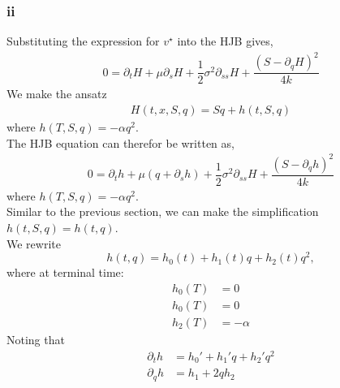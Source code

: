 \documentclass{article}
\begin{document}
\subsubsection*{ii}
Substituting the expression for $v^{\star}$ into the HJB gives,\\
\begin{equation*}
    \begin{split}
        0 = \partial_{t} H + \mu \partial_{s} H + \dfrac{1}{2} \sigma^2 \partial_{ss} H + \dfrac{(S- \partial_{q}H)^{2}}{4k}
    \end{split}
\end{equation*}
We make the ansatz
\begin{equation*}
    \begin{split}
       H(t,x,S,q) = Sq + h(t,S,q)
    \end{split}
\end{equation*}
where $h(T,S,q) = -\alpha q^2$.\\
The HJB equation can therefor be written as,\\
\begin{equation*}
    \begin{split}
       0 = \partial_{t} h + \mu(q +\partial_{s} h) + \dfrac{1}{2} \sigma^2 \partial_{ss} H + \dfrac{(S- \partial_{q}h)^{2}}{4k}
    \end{split}
\end{equation*}
where $h(T,S,q) = -\alpha q^2$.\\
Similar to the previous section, we can make the simplification $h(t,S,q) = h(t,q)$.\\
We rewrite\\
\begin{equation*}
    h(t,q) = h_{0}(t) +h_{1}(t)q +h_{2}(t)q^{2},
\end{equation*}
where at terminal time:
\begin{equation*}
    \begin{split}
      h_{0}(T) &= 0\\
      h_{0}(T) &= 0\\
      h_{2}(T) &= -\alpha
    \end{split}
\end{equation*}
Noting that\\
\begin{equation*}
    \begin{split}
      \partial_{t}h &= h_{0}'+h_{1}'q+h_{2}'q^2\\
      \partial_{q}h &=h_{1}+2qh_{2}
    \end{split}
\end{equation*}
\end{document}
